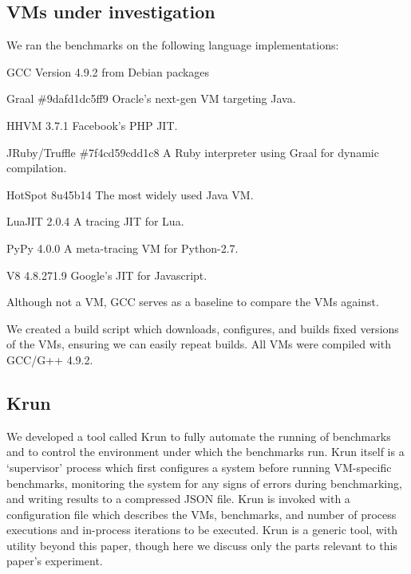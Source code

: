 \documentclass[a4paper,UKenglish]{lipics}
\newcommand{\krun}{Krun\xspace}
\begin{document}
\subsection{VMs under investigation}

We ran the benchmarks on the following language implementations:
\begin{description*}
\item[GCC] Version 4.9.2 from Debian packages
\item[Graal \#9dafd1dc5ff9] Oracle's next-gen VM targeting Java.
\item[HHVM 3.7.1] Facebook's PHP JIT.
\item[JRuby/Truffle \#7f4cd59cdd1c8] A Ruby interpreter using Graal for dynamic compilation.
\item[HotSpot 8u45b14] The most widely used Java VM.
\item[LuaJIT 2.0.4] A tracing JIT for Lua.
\item[PyPy 4.0.0] A meta-tracing VM for Python-2.7.
\item[V8 4.8.271.9] Google's JIT for Javascript.
\end{description*}
%
Although not a VM, GCC serves as a baseline to compare the VMs against.

We created a build script which downloads, configures, and builds fixed
versions of the
VMs, ensuring we can easily repeat builds.
All VMs were compiled with GCC/G++ 4.9.2.


\subsection{\krun}

We developed a tool called \krun to fully automate the running of benchmarks
and to control the environment under which the benchmarks run. \krun itself is a
`supervisor' process which first configures a system before running VM-specific
benchmarks, monitoring the system for any signs of errors during benchmarking,
and writing results to a compressed JSON file. \krun is invoked with a
configuration file which describes the VMs, benchmarks, and number of process
executions and in-process iterations to
be executed. \krun is a generic tool, with utility beyond this paper, though
here we discuss only the parts relevant to this paper's experiment.
\end{document}
